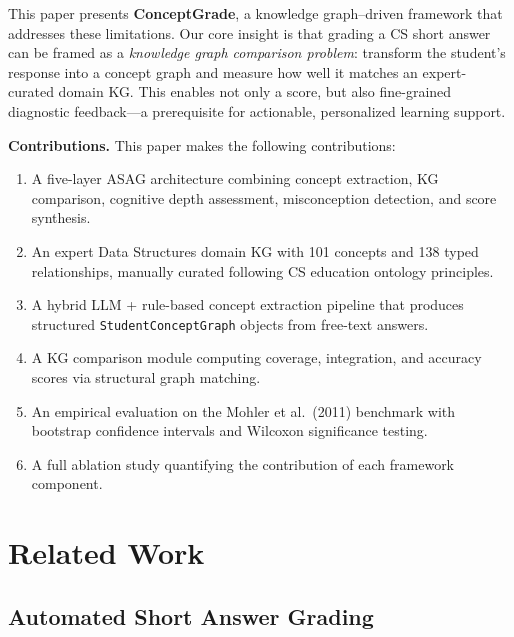 \documentclass[conference]{IEEEtran}
\begin{document}
This paper presents \textbf{ConceptGrade}, a knowledge graph–driven framework that
addresses these limitations. Our core insight is that grading a CS short answer can
be framed as a \emph{knowledge graph comparison problem}: transform the student's
response into a concept graph and measure how well it matches an expert-curated
domain KG. This enables not only a score, but also fine-grained diagnostic
feedback—a prerequisite for actionable, personalized learning support.

\textbf{Contributions.} This paper makes the following contributions:
\begin{enumerate}
  \item A five-layer ASAG architecture combining concept extraction, KG comparison,
        cognitive depth assessment, misconception detection, and score synthesis.
  \item An expert Data Structures domain KG with 101 concepts and 138 typed
        relationships, manually curated following CS education ontology principles.
  \item A hybrid LLM + rule-based concept extraction pipeline that produces
        structured \texttt{StudentConceptGraph} objects from free-text answers.
  \item A KG comparison module computing coverage, integration, and accuracy scores
        via structural graph matching.
  \item An empirical evaluation on the Mohler et al.\ (2011) benchmark with
        bootstrap confidence intervals and Wilcoxon significance testing.
  \item A full ablation study quantifying the contribution of each framework component.
\end{enumerate}

\section{Related Work}

\subsection{Automated Short Answer Grading}
\end{document}

